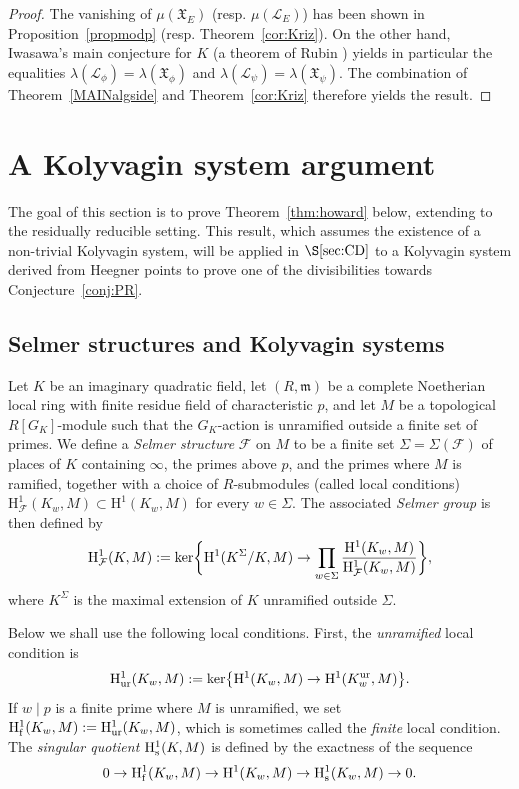 \documentclass[10pt]{amsart}
\numberwithin{equation}{section}
\theoremstyle{definition}
\theoremstyle{remark}
\newcommand{\Lcal}{\mathcal{L}}
\newcommand{\Fcal}{\mathcal{F}}
\newcommand{\rH}{\mathrm{H}}
\begin{document}
\begin{proof}
The vanishing of $\mu(\mathfrak{X}_E)$ (resp. $\mu(\mathcal{L}_E)$) has been shown in Proposition~\ref{propmodp} (resp. Theorem~\ref{cor:Kriz}). On the other hand, 
Iwasawa's main conjecture for $K$ (a theorem of Rubin \cite{rubinmainconj}) yields in particular the equalities
$\lambda(\Lcal_\phi)=\lambda(\mathfrak{X}_\phi)$ and  
$\lambda(\Lcal_\psi)=\lambda(\mathfrak{X}_\psi)$. The combination of Theorem~\ref{MAINalgside} and Theorem~\ref{cor:Kriz} therefore yields the result.
\end{proof}



\section{A Kolyvagin system argument}\label{IMCIII}

The goal of this section is to prove Theorem~\ref{thm:howard} below, extending \cite[Thm.~2.2.10]{howard} to the residually reducible setting. This result, which assumes the existence of a non-trivial Kolyvagin system, will be applied in $\S\ref{sec:CD}$ to a Kolyvagin system derived from Heegner points to prove one of the divisibilities towards Conjecture~\ref{conj:PR}.


\subsection{Selmer structures and Kolyvagin systems}

Let $K$ be an imaginary quadratic field, let $(R,\mathfrak{m})$ be a complete Noetherian local ring with finite residue field of characteristic $p$, and let 
$M$ be a topological $R[G_K]$-module such that the $G_K$-action is unramified outside a finite set of primes. We define a \emph{Selmer structure} $\mathcal{F}$ on $M$ to be a finite set $\Sigma=\Sigma(\mathcal{F})$ of places of $K$ containing $\infty$, the primes above $p$, and the primes where $M$ is ramified, together with a choice of $R$-submodules (called local conditions) 
$\rH^1_{\Fcal}(K_w,M)\subset\rH^1(K_w,M)$ for every $w\in\Sigma$. The associated \emph{Selmer group} is then defined by
\[
\rH^1_{\Fcal}(K,M):={\rm ker}\biggl\{\rH^1(K^\Sigma/K,M)\rightarrow\prod_{w\in\Sigma}\frac{\rH^1(K_w,M)}{\rH^1_{\Fcal}(K_w,M)}\biggr\},
\]
where $K^\Sigma$ is the maximal extension of $K$ unramified outside $\Sigma$. 

Below we shall use the following local conditions. First, the \emph{unramified} local condition is
\[
\rH^1_{\rm ur}(K_w,M):={\rm ker}\bigl\{\rH^1(K_w,M)\rightarrow\rH^1(K_w^{\rm ur},M)\bigr\}.
\]
If $w\mid p$ is a finite prime where $M$ is unramified, we set $\rH^1_{\rm f}(K_w,M):=\rH^1_{\rm ur}(K_w,M)$, which is sometimes called the \emph{finite} local condition. 
The \emph{singular quotient} $\rH^1_{\rm s}(K,M)$ is defined by the exactness of the sequence
\[
0\rightarrow\rH^1_{\rm f}(K_w,M)\rightarrow\rH^1(K_w,M)\rightarrow\rH^1_{\rm s}(K_w,M)\rightarrow 0.
\]
\end{document}
